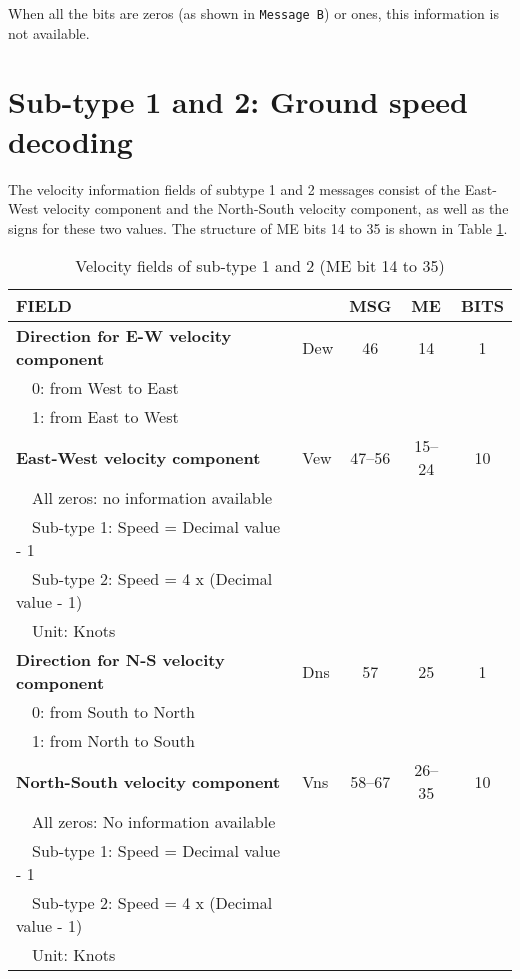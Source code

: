 When all the bits are zeros (as shown in \texttt{Message B}) or ones, this information is not available.


\section{Sub-type 1 and 2: Ground speed decoding}

The velocity information fields of subtype 1 and 2 messages consist of the East-West velocity component and the North-South velocity component, as well as the signs for these two values. The structure of ME bits 14 to 35 is shown in Table \ref{tb:adsb-velocity-bits-14-35-gs}.


\begin{table}[ht]
\caption{Velocity fields of sub-type 1 and 2 (ME bit 14 to 35)}
\label{tb:adsb-velocity-bits-14-35-gs}
\footnotesize
\begin{tabular}{|l|l|c|c|c|}
\hline
\textbf{FIELD} & & \textbf{MSG} & \textbf{ME} & \textbf{BITS} \\ \hline
\textbf{Direction for E-W velocity component} & Dew & 46 & 14 & 1\\
~~0: from West to East &&&&\\
~~1: from East to West &&&& \\ \hline
\textbf{East-West velocity component} & Vew & 47--56 & 15--24 & 10\\
~~All zeros: no information available &&&& \\
~~Sub-type 1: Speed = Decimal value - 1 &&&& \\
~~Sub-type 2: Speed = 4 x (Decimal value - 1) &&&& \\
~~Unit: Knots &&&& \\ \hline
\textbf{Direction for N-S velocity component} & Dns & 57 & 25 & 1 \\
~~0: from South to North &&&& \\
~~1: from North to South &&&& \\ \hline
\textbf{North-South velocity component} & Vns & 58--67 & 26--35 & 10\\
~~All zeros: No information available &&&&\\
~~Sub-type 1: Speed = Decimal value - 1 &&&&\\
~~Sub-type 2: Speed = 4 x (Decimal value - 1) &&&&\\
~~Unit: Knots &&&& \\ \hline
\end{tabular}
\end{table}

